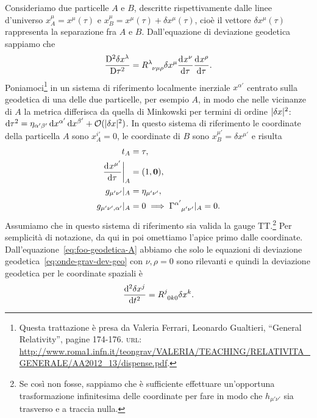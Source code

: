 Consideriamo due particelle $A$ e $B$, descritte rispettivamente dalle linee
d'universo $x^{\mu}_{A} = x^{\mu}(\tau)$ e
$x^{\mu}_{B} = x^{\mu}(\tau) + \delta x^{\mu}(\tau)$, cioè il vettore
$\delta x^{\mu}(\tau)$ rappresenta la separazione fra $A$ e $B$.  Dall'equazione
di deviazione geodetica %
sappiamo che
\begin{equation}
  \label{eq:onde-grav-dev-geo}
  \curder[2]{\delta x^{\lambda}} = \tensor{R}{^{\lambda}_{\nu\mu\rho}} \delta
  x^{\mu} \toder{x^{\nu}}{\tau} \toder{x^{\rho}}{\tau}.
\end{equation}
Poniamoci\footnote{Questa trattazione è presa da Valeria Ferrari, Leonardo
  Gualtieri, ``General Relativity'', pagine 174-176.  \textsc{url}:
  \url{http://www.roma1.infn.it/teongrav/VALERIA/TEACHING/RELATIVITA_GENERALE/AA2012_13/dispense.pdf}.}
in un sistema di riferimento localmente inerziale $x^{\alpha'}$ centrato sulla
geodetica di una delle due particelle, per esempio $A$, in modo che nelle
vicinanze di $A$ la metrica differisca da quella di Minkowski per termini di
ordine $\lvert\delta x\rvert^{2}$:
$\mathop{}\!\mathrm{d} \tau^{2} = \eta_{\alpha'\beta'}\mathop{}\!\mathrm{d} x^{\alpha'}\mathop{}\!\mathrm{d} x^{\beta'} +
\mathcal{O}(\lvert\delta x\rvert^{2})$.
In questo sistema di riferimento le coordinate della particella $A$ sono
$x_{A}^{i'} = 0$, le coordinate di $B$ sono $x^{\mu'}_{B} = \delta x^{\mu'}$ e
risulta
\begin{subequations}
  \begin{align}
    t_{A} &= \tau, \\
    \label{eq:foo-geodetica-A}
    \toder{x^{\mu'}}{\tau}\bigg|_{A} &= (1, \bm{0}), \\
    g_{\mu'\nu'}|_{A} &= \eta_{\mu'\nu'}, \\
    g_{\mu'\nu',\alpha'}|_{A} &= 0 \implies
    \tensor{\Gamma}{^{\alpha'}_{\mu'\nu'}}|_{A} = 0.
  \end{align}
\end{subequations}
Assumiamo che in questo sistema di riferimento sia valida la gauge
TT.\footnote{Se così non fosse, sappiamo che è sufficiente effettuare
  un'opportuna trasformazione infinitesima delle coordinate per fare in modo che
  $h_{\mu'\nu'}$ sia trasverso e a traccia nulla.}
Per semplicità di notazione, da qui in poi omettiamo l'apice primo dalle
coordinate.  Dall'equazione~\eqref{eq:foo-geodetica-A} abbiamo che solo le
equazioni di deviazione geodetica~\eqref{eq:onde-grav-dev-geo} con
$\nu, \rho = 0$ sono rilevanti e quindi la deviazione geodetica per le
coordinate spaziali è
\begin{equation}
  \toder[2]{\delta x^{j}}{t} = \tensor{R}{^{j}_{0k0}} \delta x^{k}.
\end{equation}
